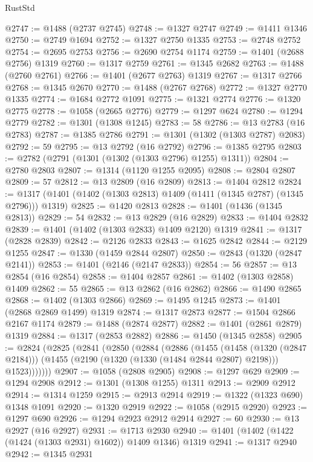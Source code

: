 \begin{lexlean}{RustStd}
\begin{coremodule}
@2747 := @1488 (@2737 @2745)
@2748 := @1327 @2747
@2749 := @1411 @1346
@2750 := @2749 @1694
@2752 := @1327 @2750 @1335
@2753 := @2748 @2752
@2754 := @2695 @2753
@2756 := @2690 @2754 @1174
@2759 := @1401 (@2688 @2756) @1319
@2760 := @1317 @2759
@2761 := @1345 @2682
@2763 := @1488 (@2760 @2761)
@2766 := @1401 (@2677 @2763) @1319
@2767 := @1317 @2766
@2768 := @1345 @2670
@2770 := @1488 (@2767 @2768)
@2772 := @1327 @2770 @1335
@2774 := @1684 @2772 @1091
@2775 := @1321 @2774
@2776 := @1320 @2775
@2778 := @1058 (@2665 @2776)
@2779 := @1297 @624
@2780 := @1294 @2779
@2782 := @1301 (@1308 @1245)
@2783 := 58
@2786 := @13 @2783 (@16 @2783)
@2787 := @1385 @2786
@2791 := @1301 (@1302 (@1303 @2787) @2083)
@2792 := 59
@2795 := @13 @2792 (@16 @2792)
@2796 := @1385 @2795
@2803 := @2782 (@2791 (@1301 (@1302 (@1303 @2796) @1255) @1311))
@2804 := @2780 @2803
@2807 := @1314 (@1120 @1255 @2095)
@2808 := @2804 @2807
@2809 := 57
@2812 := @13 @2809 (@16 @2809)
@2813 := @1404 @2812
@2824 := @1317 (@1401 (@1402 (@1303 @2813) @1409 (@1411 (@1345 @2787) (@1345 @2796))) @1319)
@2825 := @1420 @2813
@2828 := @1401 (@1436 (@1345 @2813))
@2829 := 54
@2832 := @13 @2829 (@16 @2829)
@2833 := @1404 @2832
@2839 := @1401 (@1402 (@1303 @2833) @1409 @2120) @1319
@2841 := @1317 (@2828 @2839)
@2842 := @2126 @2833
@2843 := @1625 @2842
@2844 := @2129 @1255
@2847 := @1330 (@1459 @2844 @2807)
@2850 := @2843 (@1320 (@2847 @2141))
@2853 := @1401 (@2146 (@2147 @2833))
@2854 := 56
@2857 := @13 @2854 (@16 @2854)
@2858 := @1404 @2857
@2861 := @1402 (@1303 @2858) @1409
@2862 := 55
@2865 := @13 @2862 (@16 @2862)
@2866 := @1490 @2865
@2868 := @1402 (@1303 @2866)
@2869 := @1495 @1245
@2873 := @1401 (@2868 @2869 @1499) @1319
@2874 := @1317 @2873
@2877 := @1504 @2866 @2167 @1174
@2879 := @1488 (@2874 @2877)
@2882 := @1401 (@2861 @2879) @1319
@2884 := @1317 (@2853 @2882)
@2886 := @1450 (@1345 @2858)
@2905 := @2824
    (@2825
      (@2841
        (@2850
          (@2884
            (@2886
              (@1455
                (@1458 (@1320 (@2847 @2184)))
                (@1455 (@2190 (@1320 (@1330 (@1484 @2844 @2807) @2198))) @1523)))))))
@2907 := @1058 (@2808 @2905)
@2908 := @1297 @629
@2909 := @1294 @2908
@2912 := @1301 (@1308 @1255) @1311
@2913 := @2909 @2912
@2914 := @1314 @1259
@2915 := @2913 @2914
@2919 := @1322 (@1323 @690) @1348 @1091
@2920 := @1320 @2919
@2922 := @1058 (@2915 @2920)
@2923 := @1297 @690
@2926 := @1294 @2923 @2912 @2914
@2927 := 60
@2930 := @13 @2927 (@16 @2927)
@2931 := @1713 @2930
@2940 := @1401 (@1402 (@1422 (@1424 (@1303 @2931) @1602)) @1409 @1346) @1319
@2941 := @1317 @2940
@2942 := @1345 @2931

\end{coremodule}
\end{lexlean}
